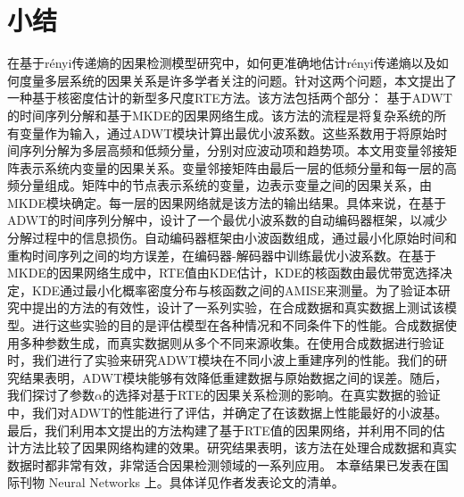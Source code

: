 \section{小结} 
在基于r\'{e}nyi传递熵的因果检测模型研究中，如何更准确地估计r\'{e}nyi传递熵以及如何度量多层系统的因果关系是许多学者关注的问题。针对这两个问题，本文提出了一种基于核密度估计的新型多尺度RTE方法。该方法包括两个部分： 基于ADWT的时间序列分解和基于MKDE的因果网络生成。该方法的流程是将复杂系统的所有变量作为输入，通过ADWT模块计算出最优小波系数。这些系数用于将原始时间序列分解为多层高频和低频分量，分别对应波动项和趋势项。本文用变量邻接矩阵表示系统内变量的因果关系。变量邻接矩阵由最后一层的低频分量和每一层的高频分量组成。矩阵中的节点表示系统的变量，边表示变量之间的因果关系，由MKDE模块确定。每一层的因果网络就是该方法的输出结果。具体来说，在基于ADWT的时间序列分解中，设计了一个最优小波系数的自动编码器框架，以减少分解过程中的信息损伤。自动编码器框架由小波函数组成，通过最小化原始时间和重构时间序列之间的均方误差，在编码器-解码器中训练最优小波系数。在基于MKDE的因果网络生成中，RTE值由KDE估计，KDE的核函数由最优带宽选择决定，KDE通过最小化概率密度分布与核函数之间的AMISE来测量。为了验证本研究中提出的方法的有效性，设计了一系列实验，在合成数据和真实数据上测试该模型。进行这些实验的目的是评估模型在各种情况和不同条件下的性能。合成数据使用多种参数生成，而真实数据则从多个不同来源收集。在使用合成数据进行验证时，我们进行了实验来研究ADWT模块在不同小波上重建序列的性能。我们的研究结果表明，ADWT模块能够有效降低重建数据与原始数据之间的误差。随后，我们探讨了参数$\alpha$的选择对基于RTE的因果关系检测的影响。在真实数据的验证中，我们对ADWT的性能进行了评估，并确定了在该数据上性能最好的小波基。最后，我们利用本文提出的方法构建了基于RTE值的因果网络，并利用不同的估计方法比较了因果网络构建的效果。研究结果表明，该方法在处理合成数据和真实数据时都非常有效，非常适合因果检测领域的一系列应用。
本章结果已发表在国际刊物  Neural Networks 上。具体详见作者发表论文的清单。

